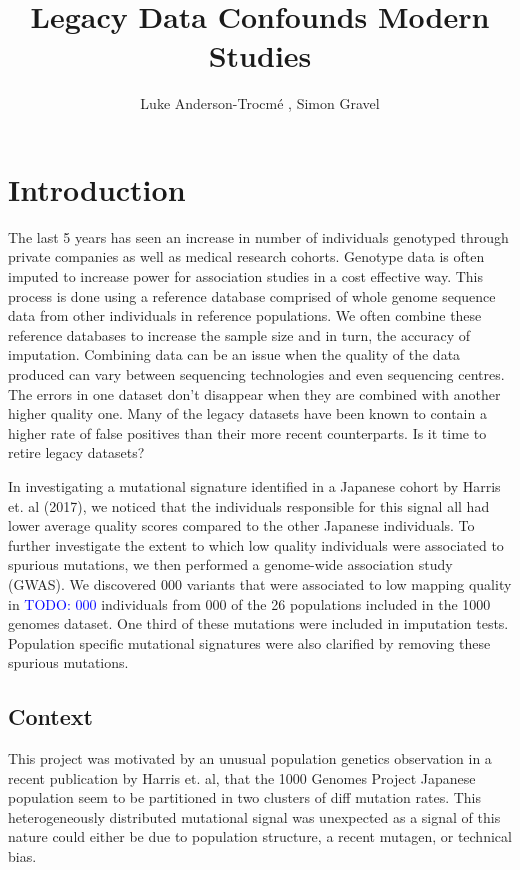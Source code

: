 \documentclass[12pt]{amsart}
\title{Legacy Data Confounds Modern Studies}
\author{Luke Anderson-Trocm\'e , Simon Gravel}
\newcommand{\todo}[1]{\textcolor{blue}{TODO: #1}}
\begin{document}
\maketitle
\tableofcontents
\clearpage
			\section{Introduction}
The last 5 years has seen an increase in number of individuals genotyped through private companies as well as medical research cohorts. Genotype data is often imputed to increase power for association studies in a cost effective way. 
This process is done using a reference database comprised of whole genome sequence data from other individuals in reference populations. 
We often combine these reference databases to increase the sample size and in turn, the accuracy of imputation. Combining data can be an issue when the quality of the data produced can vary between sequencing technologies and even sequencing centres.  
The errors in one dataset don't disappear when they are combined with another higher quality one. 
Many of the legacy datasets have been known to contain a higher rate of false positives than their more recent counterparts. 
Is it time to retire legacy datasets? 


In investigating a mutational signature identified in a Japanese cohort by Harris et. al (2017), we noticed that the individuals responsible for this signal all had lower average quality scores compared to the other Japanese individuals. 
To further investigate the extent to which low quality individuals were associated to spurious mutations, we then performed a genome-wide association study (GWAS). 
We discovered 000 variants that were associated to low mapping quality in \todo{000} individuals from 000 of the 26 populations included in the 1000 genomes dataset. 
One third of these mutations were included in imputation tests. Population specific mutational signatures were also clarified by removing these spurious mutations.

\subsection{Context}
This project was motivated by an unusual population genetics observation in a recent publication by Harris et. al, that the 1000 Genomes Project Japanese population seem to be partitioned in two clusters of diff mutation rates. 
This heterogeneously distributed mutational signal was unexpected as a signal of this nature could either be due to population structure, a recent mutagen, or technical bias.
\end{document}
